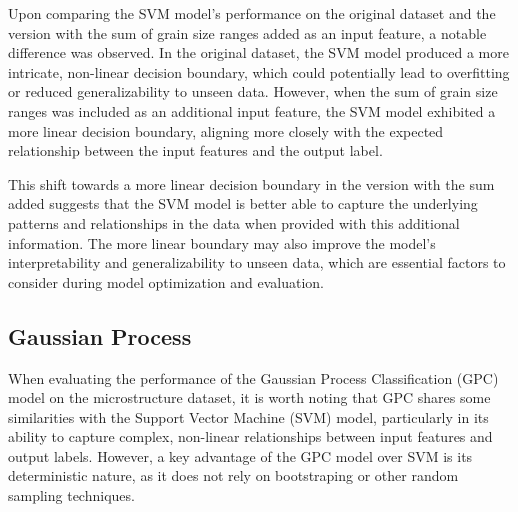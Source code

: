 \documentclass[10pt]{article}
\begin{document}
\begin{multicols}{2}
Upon comparing the SVM model's performance on the original dataset and the version with the sum of grain size ranges added as an input feature, a notable difference was observed. In the original dataset, the SVM model produced a more intricate, non-linear decision boundary, which could potentially lead to overfitting or reduced generalizability to unseen data. However, when the sum of grain size ranges was included as an additional input feature, the SVM model exhibited a more linear decision boundary, aligning more closely with the expected relationship between the input features and the output label.

This shift towards a more linear decision boundary in the version with the sum added suggests that the SVM model is better able to capture the underlying patterns and relationships in the data when provided with this additional information. The more linear boundary may also improve the model's interpretability and generalizability to unseen data, which are essential factors to consider during model optimization and evaluation.

\subsection{Gaussian Process}

When evaluating the performance of the Gaussian Process Classification (GPC)\cite{rasmussen_gaussian_2005} model on the microstructure dataset, it is worth noting that GPC shares some similarities with the Support Vector Machine (SVM) model, particularly in its ability to capture complex, non-linear relationships between input features and output labels. However, a key advantage of the GPC model over SVM is its deterministic nature, as it does not rely on bootstraping or other random sampling techniques.


\end{multicols}
\end{document}
